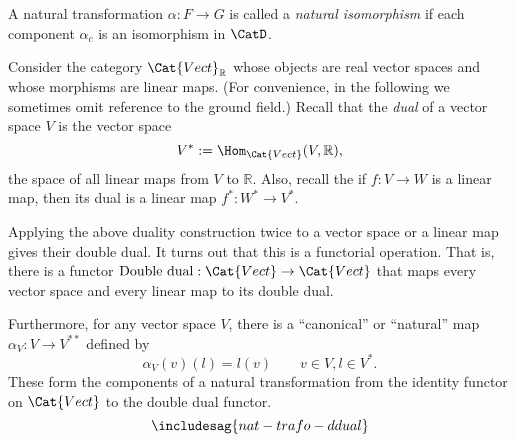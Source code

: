 \begin{ctdefinition}
    \label{def:nat_iso}
    A natural transformation $\alpha\colon F\to G$ is called a \emph{natural isomorphism} if each component $\alpha_c$ is an isomorphism in $\CatD$.
\end{ctdefinition}

\begin{example}
    Consider the category $\Cat{Vect}_{\mathbb{R}}$ whose objects are real vector spaces and whose morphisms are linear maps. (For convenience, in the following we sometimes omit reference to the ground field.) Recall that the \emph{dual} of a vector space $V$ is the vector space
    $$
    V^* := \Hom_{\Cat{Vect}}(V, \mathbb{R}),
    $$
     the space of all linear maps from $V$ to $\mathbb{R}$. Also, recall the if $f: V \rightarrow W$ is a linear map, then its dual is a linear map $f^*: W^* \rightarrow V^*$.

    Applying the above duality construction twice to a vector space or a linear map gives their double dual. It turns out that this is a functorial operation. That is, there is a functor $\text{Double dual}: \Cat{Vect} \rightarrow \Cat{Vect}$ that maps every vector space and every linear map to its double dual.

    Furthermore, for any vector space $V$, there is a ``canonical'' or ``natural'' map $\alpha_V : V \rightarrow V^{**}$ defined by
    $$
    \alpha_V(v)(l) = l(v) \quad \quad  v \in V, l \in V^*.
    $$
    These form the components of a natural transformation from the identity functor on $\Cat{Vect}$ to the double dual functor.
    \begin{equation}
        \includesag{nat-trafo-ddual}
    \end{equation}
\end{example}



